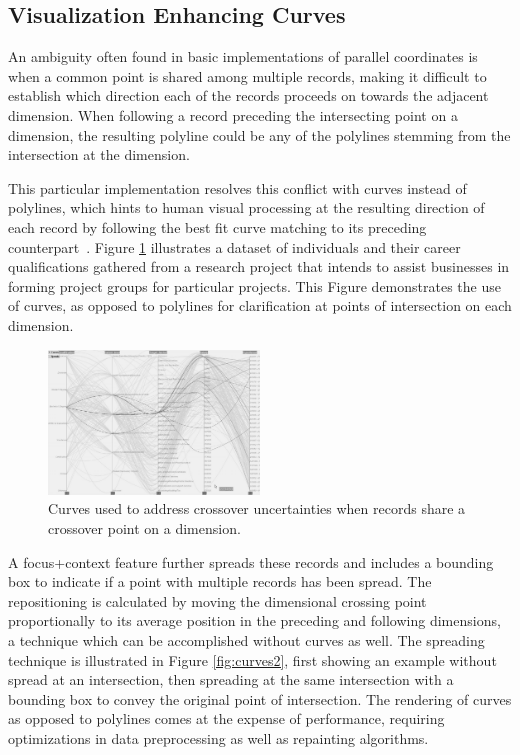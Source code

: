 \documentclass[journal]{vgtc}                %
\begin{document}
\subsection{Visualization Enhancing Curves}
\label{curves}
An ambiguity often found in basic implementations of parallel coordinates is when a common point is shared among multiple records, making it difficult to establish which direction each of the records proceeds on towards the adjacent dimension. When following a record preceding the intersecting point on a dimension, the resulting polyline could be any of the polylines stemming from the intersection at the dimension.

This particular implementation resolves this conflict with curves instead of polylines, which hints to human visual processing at the resulting direction of each record by following the best fit curve matching to its preceding counterpart~\cite{Graham:2003:UCE}. Figure \ref{fig:curves1} illustrates a dataset of individuals and their career qualifications gathered from a research project that intends to assist businesses in forming project groups for particular projects. This Figure demonstrates the use of curves, as opposed to polylines for clarification at points of intersection on each dimension. 

\begin{figure}[h!]
 \centering
 \includegraphics[width=0.5\textwidth]{images/curves.eps}
 \caption[Curves used to address crossover uncertainties.]{Curves used to address crossover uncertainties when records share a crossover point on a dimension.}
 \label{fig:curves1}
\end{figure}

A focus+context feature further spreads these records and includes a bounding box to indicate if a point with multiple records has been spread. The repositioning is calculated by moving the dimensional crossing point proportionally to its average position in the preceding and following dimensions, a technique which can be accomplished without curves as well. The spreading technique is illustrated in Figure \ref{fig:curves2}, first showing an example without spread at an intersection, then spreading at the same intersection with a bounding box to convey the original point of intersection. The rendering of curves as opposed to polylines comes at the expense of performance, requiring optimizations in data preprocessing as well as repainting algorithms.
\end{document}
